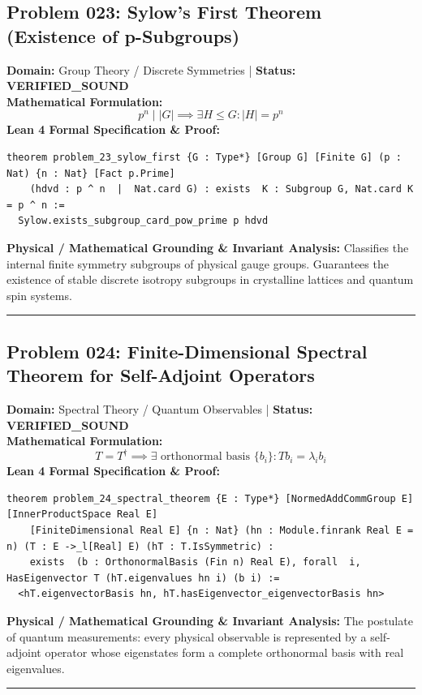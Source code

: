 \documentclass[10pt,a4paper]{article}
\begin{document}
\subsection*{Problem 023: Sylow's First Theorem (Existence of p-Subgroups)}
\textbf{Domain:} Group Theory / Discrete Symmetries \quad | \quad \textbf{Status:} \textcolor{green!70!black}{\textbf{VERIFIED\_SOUND}}\\
\textbf{Mathematical Formulation:}
\begin{equation*}
  p^n \mid |G| \implies \exists H \le G: |H| = p^n
\end{equation*}
\textbf{Lean 4 Formal Specification \& Proof:}
\begin{lstlisting}
theorem problem_23_sylow_first {G : Type*} [Group G] [Finite G] (p : Nat) {n : Nat} [Fact p.Prime]
    (hdvd : p ^ n  |  Nat.card G) : exists  K : Subgroup G, Nat.card K = p ^ n :=
  Sylow.exists_subgroup_card_pow_prime p hdvd
\end{lstlisting}
\textbf{Physical / Mathematical Grounding \& Invariant Analysis:}
Classifies the internal finite symmetry subgroups of physical gauge groups. Guarantees the existence of stable discrete isotropy subgroups in crystalline lattices and quantum spin systems.
\vspace{0.8em}\hrule\vspace{0.8em}
\subsection*{Problem 024: Finite-Dimensional Spectral Theorem for Self-Adjoint Operators}
\textbf{Domain:} Spectral Theory / Quantum Observables \quad | \quad \textbf{Status:} \textcolor{green!70!black}{\textbf{VERIFIED\_SOUND}}\\
\textbf{Mathematical Formulation:}
\begin{equation*}
  T = T^\dagger \implies \exists \text{ orthonormal basis } \{b_i\}: T b_i = \lambda_i b_i
\end{equation*}
\textbf{Lean 4 Formal Specification \& Proof:}
\begin{lstlisting}
theorem problem_24_spectral_theorem {E : Type*} [NormedAddCommGroup E] [InnerProductSpace Real E]
    [FiniteDimensional Real E] {n : Nat} (hn : Module.finrank Real E = n) (T : E ->_l[Real] E) (hT : T.IsSymmetric) :
    exists  (b : OrthonormalBasis (Fin n) Real E), forall  i, HasEigenvector T (hT.eigenvalues hn i) (b i) :=
  <hT.eigenvectorBasis hn, hT.hasEigenvector_eigenvectorBasis hn>
\end{lstlisting}
\textbf{Physical / Mathematical Grounding \& Invariant Analysis:}
The postulate of quantum measurements: every physical observable is represented by a self-adjoint operator whose eigenstates form a complete orthonormal basis with real eigenvalues.
\vspace{0.8em}\hrule\vspace{0.8em}
\end{document}
